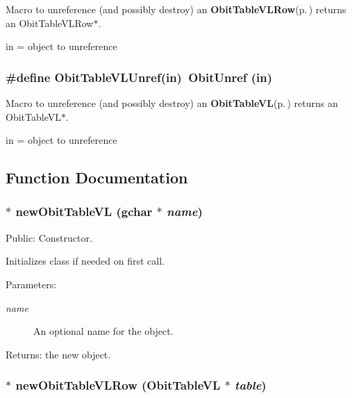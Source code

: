 Macro to unreference (and possibly destroy) an {\bf Obit\-Table\-VLRow}{\rm (p.\,\pageref{structObitTableVLRow})} returns an Obit\-Table\-VLRow$\ast$. 

in = object to unreference 
\subsubsection{\setlength{\rightskip}{0pt plus 5cm}\#define Obit\-Table\-VLUnref(in)\ Obit\-Unref (in)}\label{ObitTableVL_8h_a1}


Macro to unreference (and possibly destroy) an {\bf Obit\-Table\-VL}{\rm (p.\,\pageref{structObitTableVL})} returns an Obit\-Table\-VL$\ast$. 

in = object to unreference 

\subsection{Function Documentation}
\subsubsection{$\ast$ new\-Obit\-Table\-VL (gchar $\ast$ {\em name})}\label{ObitTableVL_8h_a11}


Public: Constructor. 

Initializes class if needed on first call. \begin{Desc}
\item[Parameters:]
\begin{description}
\item[{\em name}]An optional name for the object. \end{description}
\end{Desc}
\begin{Desc}
\item[Returns:]the new object. \end{Desc}
\subsubsection{$\ast$ new\-Obit\-Table\-VLRow ({\bf Obit\-Table\-VL} $\ast$ {\em table})}\label{ObitTableVL_8h_a8}


